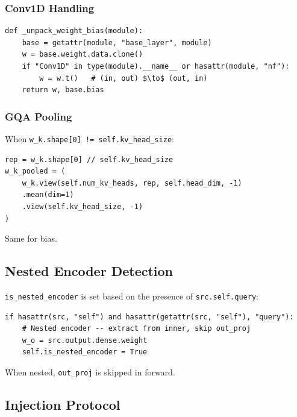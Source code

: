 \subsubsection{Conv1D Handling}

\begin{lstlisting}
def _unpack_weight_bias(module):
    base = getattr(module, "base_layer", module)
    w = base.weight.data.clone()
    if "Conv1D" in type(module).__name__ or hasattr(module, "nf"):
        w = w.t()   # (in, out) $\to$ (out, in)
    return w, base.bias
\end{lstlisting}

\subsubsection{GQA Pooling}

When \texttt{w\_k.shape[0] != self.kv\_head\_size}:

\begin{lstlisting}
rep = w_k.shape[0] // self.kv_head_size
w_k_pooled = (
    w_k.view(self.num_kv_heads, rep, self.head_dim, -1)
    .mean(dim=1)
    .view(self.kv_head_size, -1)
)
\end{lstlisting}

Same for bias.

\subsection{Nested Encoder Detection}

\texttt{is\_nested\_encoder} is set based on the presence of \texttt{src.self.query}:

\begin{lstlisting}
if hasattr(src, "self") and hasattr(getattr(src, "self"), "query"):
    # Nested encoder -- extract from inner, skip out_proj
    w_o = src.output.dense.weight
    self.is_nested_encoder = True
\end{lstlisting}

When nested, \texttt{out\_proj} is skipped in forward.

\subsection{Injection Protocol}

